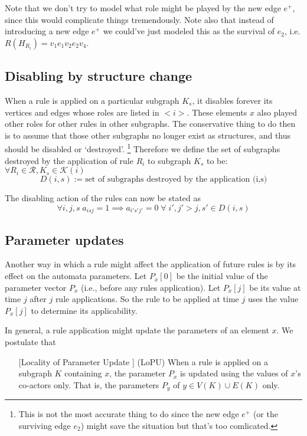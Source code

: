 \documentclass[11pt, oneside, reqno]{article}
\newcommand{\Kc}{\mathcal{K}}
\newcommand{\Rc}{\mathcal{R}}
\begin{document}
Note that we don't try to model what role might be played by the new edge $e^+$, since this would complicate things tremendously.
Note also that instead of introducing a new edge $e^+$ we could've just modeled this as the survival of $e_2$, i.e. $R(H_{R_i}) = v_1e_1v_2e_2v_4$. 

\subsection{Disabling by structure change}
When a rule is applied on a particular subgraph $K_s$, it disables forever its vertices and edges whose roles are listed in $<i>$.
These elements $x$ also played other roles for other rules in other subgraphs.
The conservative thing to do then is to assume that those other subgraphs no longer exist as structures, and thus should be disabled or `destroyed'.
\footnote{This is not the most accurate thing to do since the new edge $e^+$ (or the surviving edge $e_2$) might save the situation but that's too comlicated.}
Therefore we define the set of subgraphs destroyed by the application of rule $R_i$ to subgraph $K_s$ to be: $\forall R_i \in \Rc, K_s \in \Kc(i)$
\begin{equation}
\label{eq:Di}
 D(i,s) := \textrm{set of subgraphs destroyed by the application (i,s)}
\end{equation}
%

The disabling action of the rules can now be stated as
\begin{equation}
\label{eq:disabling}
\forall i,j,s \; a_{isj} =1 \implies a_{i's'j'} = 0 \;\forall \; i', j'>j,s' \in D(i,s)
\end{equation}

\subsection{Parameter updates}
Another way in which a rule might affect the application of future rules is by its effect on the automata parameters.
Let $P_x[0]$ be the initial value of the parameter vector $P_x$ (i.e., before any rules application).
Let $P_x[j]$ be its value at time $j$ after $j$ rule applications.
So the rule to be applied at time $j$ uses the value $P_x[j]$ to determine its applicability.

In general, a rule application might update the parameters of an element $x$.
We postulate that 
\begin{enumerate}
	\item [[Locality of Parameter Update]] (LoPU) When a rule is applied on a subgraph $K$ containing $x$, the parameter $P_x$ is updated using the values of $x$'s co-actors only. 
	That is, the parameters $P_y$ of $y \in V(K)\cup E(K)$ only.
	\label{LoPU}
\end{enumerate}
\end{document}
